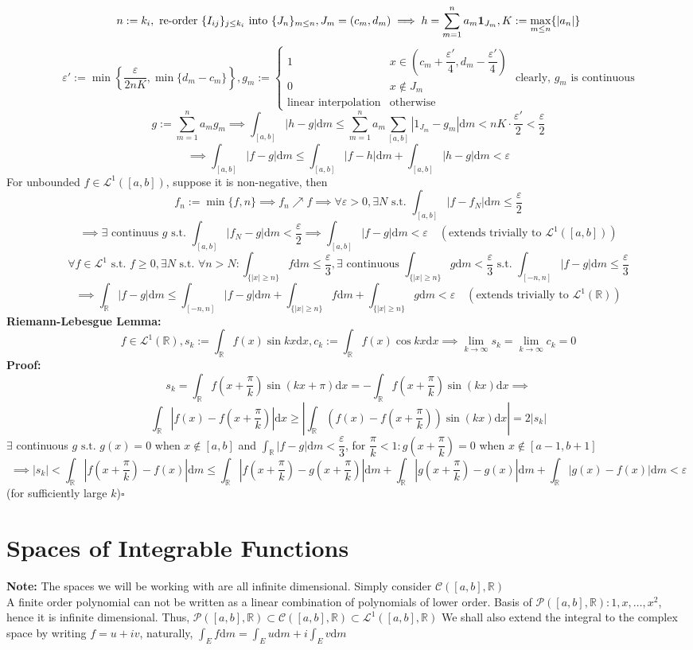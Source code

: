 \documentclass{article}
\newcommand{\R}{\mathbb{R}}
\newcommand{\summn}{\displaystyle\sum_{m=1}^n}
\newcommand{\limkinf}{\displaystyle\lim_{k\to\infty}}
\newcommand{\st}{\mbox{ s.t. }}
\newcommand{\0}{{\bf{0}}}
\newcommand{\1}{{\bf{1}}}
\newcommand{\dint}{\displaystyle\int}
\newcommand{\dif}{\mbox{d}}
\newcommand{\incto}{\nearrow}
\begin{document}
$$n:=k_i,\mbox{ re-order }\{I_{ij}\}_{j\le k_i}\mbox{ into }\{J_n\}_{m\le n},J_m=(c_m,d_m)\implies h=\summn a_m\1_{J_m},K:=\max_{m\le n}\{|a_n|\}$$
$$\varepsilon':=\min\left\{\frac{\varepsilon}{2nK},\min\{d_m-c_m\}\right\},g_m:=\begin{cases}
    1&x\in(c_m+\dfrac{\varepsilon'}{4},d_m-\dfrac{\varepsilon'}{4})\\
    0&x\notin J_m\\
    \mbox{linear interpolation}&\mbox{otherwise}
\end{cases}\mbox{ clearly, }g_m\mbox{ is continuous}$$
$$g:=\summn a_mg_m\implies\int_{[a,b]}|h-g|\dif m\le\summn a_m\sum_{[a,b]}|1_{J_m}-g_m|\dif m<nK\cdot\frac{\varepsilon'}{2}<\frac{\varepsilon}{2}$$
$$\implies\int_{[a,b]}|f-g|\dif m\le\int_{[a,b]}|f-h|\dif m+\int_{[a,b]}|h-g|\dif m<\varepsilon$$
For unbounded $f\in\mathcal{L}^1([a,b])$, suppose it is non-negative, then
$$f_n:=\min\{f,n\}\implies f_n\incto f\implies\forall\varepsilon>0,\exists N\st\int_{[a,b]}|f-f_N|\dif m\le\frac{\varepsilon}{2}$$
$$\implies\exists\mbox{ continuus }g\st\int_{[a,b]}|f_N-g|\dif m<\frac{\varepsilon}{2}\implies\int_{[a,b]}|f-g|\dif m<\varepsilon\quad(\mbox{extends trivially to }\mathcal{L}^1([a,b]))$$
$$\forall f\in\mathcal{L}^1\st f\geq0,\exists N\st\forall n>N:\int_{\{|x|\geq n\}}f\dif m\le\frac{\varepsilon}{3},\exists\mbox{ continuous }\int_{\{|x|\geq n\}}g\dif m<\frac{\varepsilon}{3}\st\int_{[-n,n]}|f-g|\dif m\le\frac{\varepsilon}{3}$$
$$\implies\int_\R|f-g|\dif m\le\int_{[-n,n]}|f-g|\dif m+\int_{\{|x|\geq n\}}f\dif m+\int_{\{|x|\geq n\}}g\dif m<\varepsilon\quad(\mbox{extends trivially to }\mathcal{L}^1(\R))$$
\textbf{Riemann-Lebesgue Lemma:}
$$f\in\mathcal{L}^1(\R),s_k:=\dint_\R f(x)\sin kx\dif x,c_k:=\int_\R f(x)\cos kx\dif x\implies\limkinf s_k=\limkinf c_k=0$$
\textbf{Proof:}
$$s_k=\int_\R f(x+\frac{\pi}{k})\sin(kx+\pi)\dif x=-\int_\R f(x+\frac{\pi}{k})\sin(kx)\dif x\implies$$
$$\int_\R|f(x)-f(x+\frac{\pi}{k})|\dif x\geq\left|\int_\R(f(x)-f(x+\frac{\pi}{k}))\sin(kx)\dif x\right|=2|s_k|$$
$\exists$ continuous $g\st g(x)=0$ when $x\notin[a,b]$ and $\dint_\R|f-g|\dif m<\dfrac{\varepsilon}{3}$, for $\dfrac{\pi}{k}<1:g(x+\dfrac{\pi}{k})=0$ when $x\notin[a-1,b+1]$
$$\implies|s_k|<\int_\R|f(x+\frac{\pi}{k})-f(x)|\dif m\le\int_\R|f(x+\frac{\pi}{k})-g(x+\frac{\pi}{k})|\dif m+\int_\R|g(x+\frac{\pi}{k})-g(x)|\dif m+\int_\R|g(x)-f(x)|\dif m<\varepsilon$$
(for sufficiently large $k$)\null\hfill{$\square$}
\clearpage
\section{Spaces of Integrable Functions}
\textbf{Note:} The spaces we will be working with are all infinite dimensional. Simply consider $\mathcal{C}([a,b],\R)$\\
A finite order polynomial can not be written as a linear combination of polynomials of lower order. Basis of $\mathcal{P}([a,b],\R):1,x,\dots,x^2$, hence it is infinite dimensional. Thus, $\mathcal{P}([a,b],\R)\subset\mathcal{C}([a,b],\R)\subset\mathcal{L}^1([a,b],\R)$
We shall also extend the integral to the complex space by writing $f=u+iv$, naturally, $\dint_Ef\dif m=\dint_Eu\dif m+i\dint_Ev\dif m$
\end{document}
